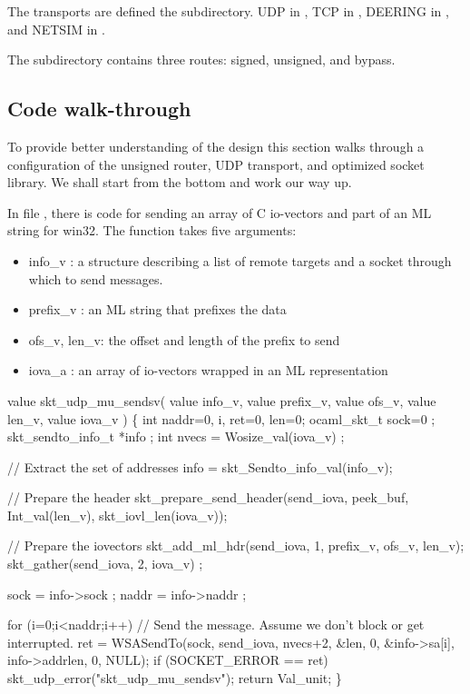 The transports are defined the  subdirectory. 
UDP in , TCP in ,
DEERING in , and NETSIM in
.

The  subdirectory contains three routes: signed,
unsigned, and bypass.

\subsection{Code walk-through}
To provide better understanding of the design this section walks
through a configuration of the unsigned router, UDP transport, 
and optimized socket library. We shall start from the bottom
and work our way up. 

In file , there is code for sending an
array of C io-vectors and part of an ML string for win32. The function takes
five arguments:
\begin{itemize}
\item info\_v : a structure describing a list of remote targets and a
socket through which to send messages.
\item prefix\_v : an ML string that prefixes the data
\item ofs\_v, len\_v: the offset and length of the prefix to send
\item iova\_a : an array of io-vectors wrapped in an ML representation
\end{itemize}

\begin{codebox}
value skt_udp_mu_sendsv(
	value info_v,
	value prefix_v,
	value ofs_v,
	value len_v,
	value iova_v
) \{
    int naddr=0, i, ret=0, len=0;
    ocaml_skt_t sock=0 ;
    skt_sendto_info_t *info ;
    int nvecs = Wosize_val(iova_v) ;

    // Extract the set of addresses
    info = skt_Sendto_info_val(info_v);

    // Prepare the header
    skt_prepare_send_header(send_iova, peek_buf, Int_val(len_v), skt_iovl_len(iova_v));

    // Prepare the iovectors
    skt_add_ml_hdr(send_iova, 1, prefix_v, ofs_v, len_v);
    skt_gather(send_iova, 2, iova_v) ;
    
    sock = info->sock ;
    naddr = info->naddr ;

    for (i=0;i<naddr;i++) {
	// Send the message.  Assume we don't block or get interrupted.  
	ret = WSASendTo(sock, send_iova, nvecs+2, &len, 0,
			&info->sa[i], info->addrlen, 0, NULL);
	if (SOCKET_ERROR == ret) skt_udp_error("skt_udp_mu_sendsv");
    }
    return Val_unit;
\}
\end{codebox}

